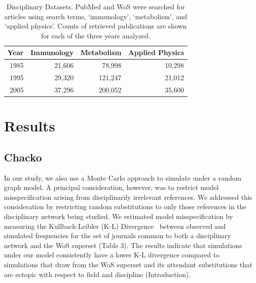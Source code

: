 \documentclass[NETN]{stjour}
\begin{document}
\begin{table}[ht]
\caption{Disciplinary Datasets. PubMed and WoS were searched for articles using search terms, `immunology', `metabolism', and `applied physics'. Counts of retrieved publications are shown for each of the three years analyzed.}
\label{tab:label}
\centering
\begin{tabular}{|r r r r|}
  \hline
Year & Immunology & Metabolism & Applied Physics \\ 
  \hline
1985 & 21,606 & 78,998 & 10,298 \\ 
1995 & 29,320 & 121,247 & 21,012  \\ 
2005 & 37,296 & 200,052 & 35,600  \\ 
 \hline
\end{tabular}
\end{table}


\section{Results}
\subsection{Chacko} In our study, we also use a Monte Carlo approach to simulate under a random graph model. A  principal consideration, however, was to restrict model misspecification arising from disciplinarily irrelevant references. We addressed this consideration by restricting random substitutions to only those references in the disciplinary network being studied. We estimated model misspecification by measuring the Kullback-Leibler (K-L) Divergence~\citep{kullback_information_1951} between observed and simulated frequencies for the set of journals common to both a disciplinary network and the WoS superset (Table 3). The results indicate that simulations under our model consistently have a lower K-L divergence compared to simulations that draw from the WoS superset and its attendant substitutions that are ectopic with respect to field and discipline (Introduction).
\end{document}
